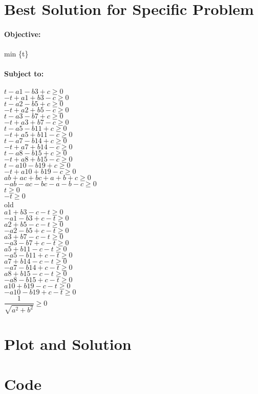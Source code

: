 \documentclass{article}
\begin{document}
\section*{Best Solution for Specific Problem}
\paragraph*{Objective:}
min \{t\}

\paragraph*{Subject to:\\}
$t - a1 - b3 + c \geq 0$\\
$-t + a1 + b3 - c \geq 0$\\
$t - a2 - b5 + c \geq 0$\\
$-t + a2 + b5 - c \geq 0$\\
$t - a3 - b7 + c \geq 0$\\
$-t + a3 + b7 - c \geq 0$\\
$t - a5 - b11 + c \geq 0$\\
$-t + a5 + b11 - c \geq 0$\\
$t - a7 - b14 + c \geq 0$\\
$-t + a7 + b14 - c \geq 0$\\
$t - a8 - b15 + c \geq 0$\\
$-t + a8 + b15 - c \geq 0$\\
$t - a10 - b19 + c \geq 0$\\
$-t + a10 + b19 - c \geq 0$\\
$ab + ac + bc + a + b + c \geq 0$\\
$-ab - ac - bc - a - b - c \geq 0$\\
$t \geq 0$\\
$-t \geq 0$\\
old\\
$a1 + b3 - c - t \geq 0$\\
$-a1 - b3 + c - t \geq 0$\\
$a2 + b5 - c - t \geq 0$\\
$-a2 - b5 + c - t \geq 0$\\
$a3 + b7 - c - t \geq 0$\\
$-a3 - b7 + c - t \geq 0$\\
$a5 + b11 - c - t \geq 0$\\
$-a5 - b11 + c - t \geq 0$\\
$a7 + b14 - c - t \geq 0$\\
$-a7 - b14 + c - t \geq 0$\\
$a8 + b15 - c - t \geq 0$\\
$-a8 - b15 + c - t \geq 0$\\
$a10 + b19 - c - t \geq 0$\\
$-a10 - b19 + c - t \geq 0$\\
$\dfrac{1} {\sqrt{a^2 + b^2}} \geq 0$


\section*{Plot and Solution}

\section*{Code}
\end{document}
